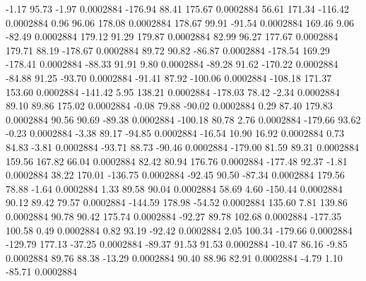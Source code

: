        -1.17       95.73       -1.97     0.0002884
     -176.94       88.41      175.67     0.0002884
       56.61      171.34     -116.42     0.0002884
        0.96       96.06      178.08     0.0002884
      178.67       99.91      -91.54     0.0002884
      169.46        9.06      -82.49     0.0002884
      179.12       91.29      179.87     0.0002884
       82.99       96.27      177.67     0.0002884
      179.71       88.19     -178.67     0.0002884
       89.72       90.82      -86.87     0.0002884
     -178.54      169.29     -178.41     0.0002884
      -88.33       91.91        9.80     0.0002884
      -89.28       91.62     -170.22     0.0002884
      -84.88       91.25      -93.70     0.0002884
      -91.41       87.92     -100.06     0.0002884
     -108.18      171.37      153.60     0.0002884
     -141.42        5.95      138.21     0.0002884
     -178.03       78.42       -2.34     0.0002884
       89.10       89.86      175.02     0.0002884
       -0.08       79.88      -90.02     0.0002884
        0.29       87.40      179.83     0.0002884
       90.56       90.69      -89.38     0.0002884
     -100.18       80.78        2.76     0.0002884
     -179.66       93.62       -0.23     0.0002884
       -3.38       89.17      -94.85     0.0002884
      -16.54       10.90       16.92     0.0002884
        0.73       84.83       -3.81     0.0002884
      -93.71       88.73      -90.46     0.0002884
     -179.00       81.59       89.31     0.0002884
      159.56      167.82       66.04     0.0002884
       82.42       80.94      176.76     0.0002884
     -177.48       92.37       -1.81     0.0002884
       38.22      170.01     -136.75     0.0002884
      -92.45       90.50      -87.34     0.0002884
      179.56       78.88       -1.64     0.0002884
        1.33       89.58       90.04     0.0002884
       58.69        4.60     -150.44     0.0002884
       90.12       89.42       79.57     0.0002884
     -144.59      178.98      -54.52     0.0002884
      135.60        7.81      139.86     0.0002884
       90.78       90.42      175.74     0.0002884
      -92.27       89.78      102.68     0.0002884
     -177.35      100.58        0.49     0.0002884
        0.82       93.19      -92.42     0.0002884
        2.05      100.34     -179.66     0.0002884
     -129.79      177.13      -37.25     0.0002884
      -89.37       91.53       91.53     0.0002884
      -10.47       86.16       -9.85     0.0002884
       89.76       88.38      -13.29     0.0002884
       90.40       88.96       82.91     0.0002884
       -4.79        1.10      -85.71     0.0002884
